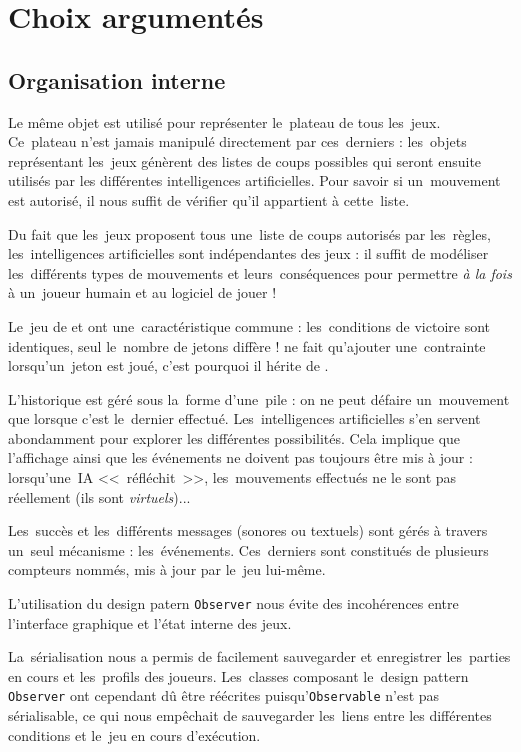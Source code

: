 \section{Choix argumentés}

\subsection{Organisation interne}
Le même objet est utilisé pour représenter le~plateau de tous les~jeux. Ce~plateau n'est jamais manipulé directement par ces~derniers :
les~objets représentant les~jeux génèrent des listes de coups possibles qui seront ensuite utilisés par les différentes intelligences artificielles.
Pour savoir si un~mouvement est autorisé, il nous suffit de vérifier qu'il appartient à cette~liste. 

Du fait que les~jeux proposent tous une~liste de coups autorisés par les~règles, les~intelligences artificielles sont indépendantes des jeux :
il suffit de modéliser les~différents types de mouvements et leurs~conséquences pour permettre \emph{à la fois} à un~joueur humain et au logiciel de jouer !

Le~jeu de \ttt{} et \cf{} ont une~caractéristique commune : les~conditions de victoire sont identiques, seul le~nombre de jetons diffère !
\cf{} ne fait qu'ajouter une~contrainte lorsqu'un~jeton est joué, c'est pourquoi il hérite de \ttt.

L'historique est géré sous la~forme d'une~pile : on ne peut défaire un~mouvement que lorsque c'est le~dernier effectué. 
Les~intelligences artificielles s'en servent abondamment pour explorer les différentes possibilités. 
Cela implique que l'affichage ainsi que les événements ne doivent pas toujours être mis à jour : 
lorsqu'une~IA <<~réfléchit~>>, les~mouvements effectués ne le sont pas réellement (ils sont \emph{virtuels})...

Les~succès et les~différents messages (sonores ou textuels) sont gérés à travers un~seul mécanisme : 
les~événements. Ces~derniers sont constitués de plusieurs compteurs nommés, mis à jour par le~jeu lui-même. 

L'utilisation du design patern \texttt{Observer} nous évite des incohérences entre l'interface graphique et l'état interne des jeux.

La~sérialisation nous a permis de facilement sauvegarder et enregistrer les~parties en cours et les~profils des joueurs. 
Les~classes composant le~design pattern \texttt{Observer} ont cependant dû être réécrites puisqu'\texttt{Observable} n'est pas sérialisable, 
ce qui nous empêchait de sauvegarder les~liens entre les différentes conditions et le~jeu en cours d'exécution.


